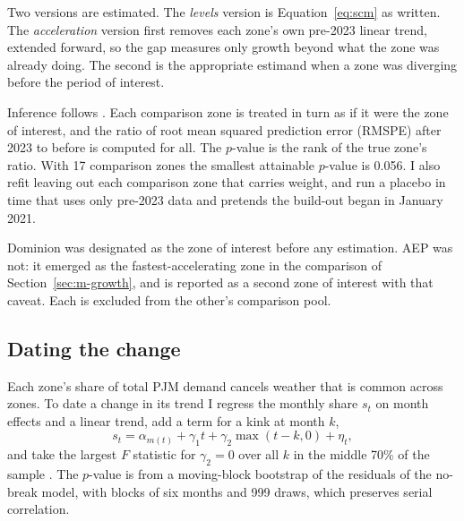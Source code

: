 \documentclass[11pt,a4paper]{article}
\begin{document}
Two versions are estimated. The \emph{levels} version is Equation~\eqref{eq:scm} as written. The \emph{acceleration} version first removes each zone's own pre-2023 linear trend, extended forward, so the gap measures only growth beyond what the zone was already doing. The second is the appropriate estimand when a zone was diverging before the period of interest.

Inference follows \cite{adh2010}. Each comparison zone is treated in turn as if it were the zone of interest, and the ratio of root mean squared prediction error (RMSPE) after 2023 to before is computed for all. The $p$-value is the rank of the true zone's ratio. With 17 comparison zones the smallest attainable $p$-value is 0.056. I also refit leaving out each comparison zone that carries weight, and run a placebo in time that uses only pre-2023 data and pretends the build-out began in January 2021.

Dominion was designated as the zone of interest before any estimation. AEP was not: it emerged as the fastest-accelerating zone in the comparison of Section~\ref{sec:m-growth}, and is reported as a second zone of interest with that caveat. Each is excluded from the other's comparison pool.

\subsection{Dating the change}
Each zone's share of total PJM demand cancels weather that is common across zones. To date a change in its trend I regress the monthly share $s_t$ on month effects and a linear trend, add a term for a kink at month $k$,
\begin{equation}
s_t = \alpha_{m(t)} + \gamma_1 t + \gamma_2 \max(t-k, 0) + \eta_t ,
\end{equation}
and take the largest $F$ statistic for $\gamma_2 = 0$ over all $k$ in the middle 70\% of the sample \cite{andrews}. The $p$-value is from a moving-block bootstrap \cite{kunsch} of the residuals of the no-break model, with blocks of six months and 999 draws, which preserves serial correlation.
\end{document}
